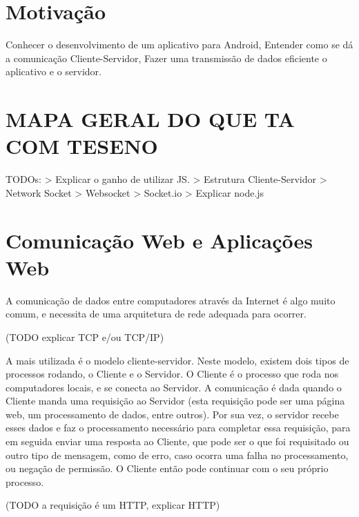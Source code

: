 \documentclass[a4paper,12pt]{article}
\begin{document}
\newpage



\section{Motivação}

Conhecer o desenvolvimento de um aplicativo para Android,
Entender como se dá a comunicação Cliente-Servidor,
Fazer uma transmissão de dados eficiente o aplicativo e o servidor.





\section{MAPA GERAL DO QUE TA COM TESENO}

TODOs:
> Explicar o ganho de utilizar JS.
> Estrutura Cliente-Servidor
  > Network Socket > Websocket > Socket.io
> Explicar node.js





\section{Comunicação Web e Aplicações Web}

A comunicação de dados entre computadores através da Internet é algo muito comum, e necessita de uma arquitetura de rede adequada para ocorrer.

(TODO explicar TCP e/ou TCP/IP)

A mais utilizada é o modelo cliente-servidor. Neste modelo, existem dois tipos de processos rodando, o Cliente e o Servidor. O Cliente é o processo que roda nos computadores locais, e se conecta ao Servidor. A comunicação é dada quando o Cliente manda uma requisição ao Servidor (esta requisição pode ser uma página web, um processamento de dados, entre outros). Por sua vez, o servidor recebe esses dados e faz o processamento necessário para completar essa requisição, para em seguida enviar uma resposta ao Cliente, que pode ser o que foi requisitado ou outro tipo de mensagem, como de erro, caso ocorra uma falha no processamento, ou negação de permissão. O Cliente então pode continuar com o seu próprio processo.

(TODO a requisição é um HTTP, explicar HTTP)
\end{document}
